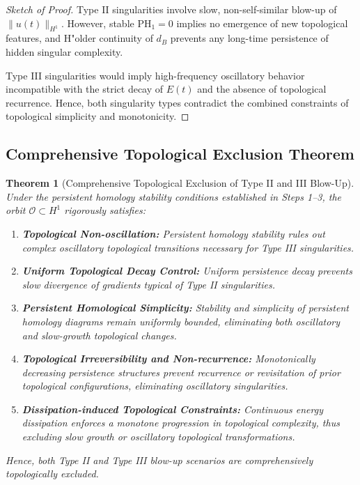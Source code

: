 \documentclass[11pt]{article}
\newtheorem{theorem}{Theorem}[section]
\theoremstyle{definition}
\begin{document}
\begin{proof}[Sketch of Proof]
Type II singularities involve slow, non-self-similar blow-up of $\|u(t)\|_{H^1}$. However, stable $\mathrm{PH}_1 = 0$ implies no emergence of new topological features, and H"older continuity of $d_B$ prevents any long-time persistence of hidden singular complexity.

Type III singularities would imply high-frequency oscillatory behavior incompatible with the strict decay of $E(t)$ and the absence of topological recurrence. Hence, both singularity types contradict the combined constraints of topological simplicity and monotonicity.
\end{proof}

\subsection*{Comprehensive Topological Exclusion Theorem}

\begin{theorem}[Comprehensive Topological Exclusion of Type II and III Blow-Up]
\label{thm:comprehensive_exclusion}
Under the persistent homology stability conditions established in Steps 1--3, the orbit $\mathcal{O} \subset H^1$ rigorously satisfies:
\begin{enumerate}
  \item \textbf{Topological Non-oscillation:} Persistent homology stability rules out complex oscillatory topological transitions necessary for Type III singularities.
  \item \textbf{Uniform Topological Decay Control:} Uniform persistence decay prevents slow divergence of gradients typical of Type II singularities.
  \item \textbf{Persistent Homological Simplicity:} Stability and simplicity of persistent homology diagrams remain uniformly bounded, eliminating both oscillatory and slow-growth topological changes.
  \item \textbf{Topological Irreversibility and Non-recurrence:} Monotonically decreasing persistence structures prevent recurrence or revisitation of prior topological configurations, eliminating oscillatory singularities.
  \item \textbf{Dissipation-induced Topological Constraints:} Continuous energy dissipation enforces a monotone progression in topological complexity, thus excluding slow growth or oscillatory topological transformations.
\end{enumerate}
Hence, both Type II and Type III blow-up scenarios are comprehensively topologically excluded.
\end{theorem}
\end{document}
